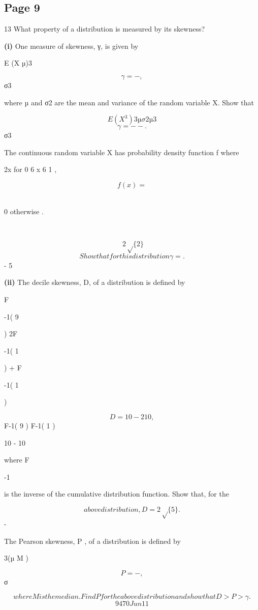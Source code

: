 \documentclass[12pt]{article}
\begin{document}
\subsection*{Page 9}
\begin{flushleft}
13 What property of a distribution is measured by its skewness?\par
\textbf{(i)} One measure of skewness, γ, is given by\par
E (X µ)3\par
\[γ = - ,\]
σ3\par
where µ and σ2 are the mean and variance of the random variable X. Show that\par
\[E(X^3) 3µσ2 µ3\]
\[γ = - - .\]
σ3\par
The continuous random variable X has probability density function f where\par
2x for 0 6 x 6 1 ,\par
\[f(x) =\]
\par
0 otherwise .\par
\par
\[2\sqrt\{2\}\]
\[Show that for this distribution γ = .\]
- 5\par
\textbf{(ii)} The decile skewness, D, of a distribution is defined by\par
F\par
-1( 9\par
) 2F\par
-1( 1\par
) + F\par
-1( 1\par
)\par
\[D = 10 - 2 10 ,\]
F-1( 9 ) F-1( 1 )\par
10 - 10\par
where F\par
-1\par
is the inverse of the cumulative distribution function. Show that, for the\par
\[above distribution, D = 2 \sqrt\{5\} .\]
-\par
The Pearson skewness, P , of a distribution is defined by\par
3(µ M )\par
\[P = - ,\]
σ\par
\[where M is the median. Find P for the above distribution and show that D > P > γ .\]
\[9470 Jun11\]
\end{flushleft}
\end{document}
